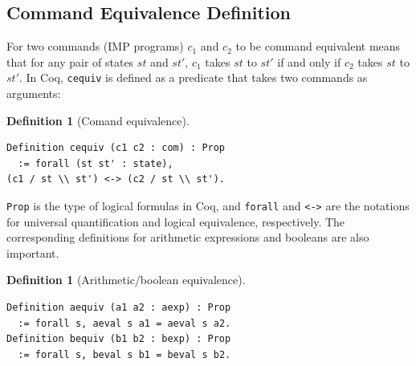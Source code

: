 \documentclass[compsoc,conference,a4paper,10pt,times]{IEEEtran}
\newtheorem{defin}[theorem]{Definition}
\begin{document}




\subsection{Command Equivalence Definition}\label{commequiv} 
    For two commands (IMP programs) $c_1$ and $c_2$ to be command equivalent means that for any pair of states $st$ and $st'$, $c_1$ takes $st$ to $st'$ if and only if $c_2$ takes $st$ to $st'$.  In Coq, \texttt{cequiv}\cite{SFV2}  is defined as a predicate that takes two commands as arguments:
\begin{defin}[Comand equivalence]\label{def:cequiv}
\begin{verbatim}
Definition cequiv (c1 c2 : com) : Prop 
  := forall (st st' : state), 
(c1 / st \\ st') <-> (c2 / st \\ st').
\end{verbatim}
\end{defin}
\texttt{Prop} is the type of logical formulas in Coq, and \texttt{forall} and \texttt{<->} are the notations for universal quantification and logical equivalence, respectively. The corresponding definitions for arithmetic expressions and booleans are also important.
\begin{defin}[Arithmetic/boolean equivalence]
\begin{verbatim}
Definition aequiv (a1 a2 : aexp) : Prop
  := forall s, aeval s a1 = aeval s a2.
Definition bequiv (b1 b2 : bexp) : Prop
  := forall s, beval s b1 = beval s b2.
\end{verbatim}
\end{defin}
\end{document}
